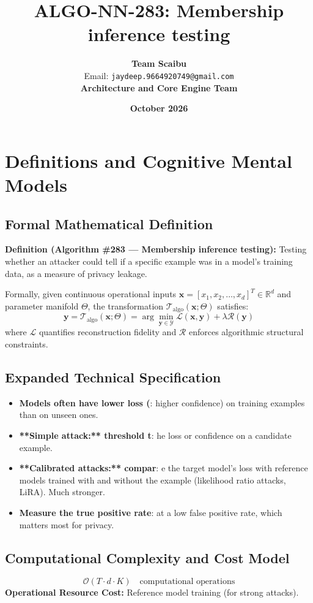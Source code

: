 \documentclass[11pt,a4paper]{article}
\title{\textbf{ALGO-NN-283: Membership inference testing}}
\author{\textbf{Team Scaibu} \\ \small Email: \texttt{jaydeep.9664920749@gmail.com} \\ \small \textbf{Architecture and Core Engine Team}}
\date{\textbf{October 2026}}
\theoremstyle{definition}
\begin{document}
\maketitle

\section{Definitions and Cognitive Mental Models}

\subsection{Formal Mathematical Definition}
\textbf{Definition (Algorithm \#283 --- Membership inference testing):}
Testing whether an attacker could tell if a specific example was in a model's training data, as a measure of privacy leakage.

Formally, given continuous operational inputs $\mathbf{x} = [x_1, x_2, \dots, x_d]^T \in \mathbb{R}^d$ and parameter manifold $\Theta$, the transformation $\mathcal{T}_{\text{algo}}(\mathbf{x}; \Theta)$ satisfies:
{\boldmath
\begin{equation}
\mathbf{y} = \mathcal{T}_{\text{algo}}(\mathbf{x}; \Theta) = \arg\min_{\mathbf{y} \in \mathcal{Y}} \mathcal{L}(\mathbf{x}, \mathbf{y}) + \lambda \mathcal{R}(\mathbf{y})
\end{equation}
}
where $\mathcal{L}$ quantifies reconstruction fidelity and $\mathcal{R}$ enforces algorithmic structural constraints.

\subsection{Expanded Technical Specification}
\begin{itemize}
\item \textbf{Models often have lower loss (}: higher confidence) on training examples than on unseen ones.
\item \textbf{**Simple attack:** threshold t}: he loss or confidence on a candidate example.
\item \textbf{**Calibrated attacks:** compar}: e the target model's loss with reference models trained with and without the example (likelihood ratio attacks, LiRA). Much stronger.
\item \textbf{Measure the true positive rate}:  at a low false positive rate, which matters most for privacy.
\end{itemize}

\subsection{Computational Complexity and Cost Model}
\begin{equation}
\mathcal{O}(T \cdot d \cdot K) \quad \text{computational operations}
\end{equation}
\textbf{Operational Resource Cost:} Reference model training (for strong attacks).
\end{document}
